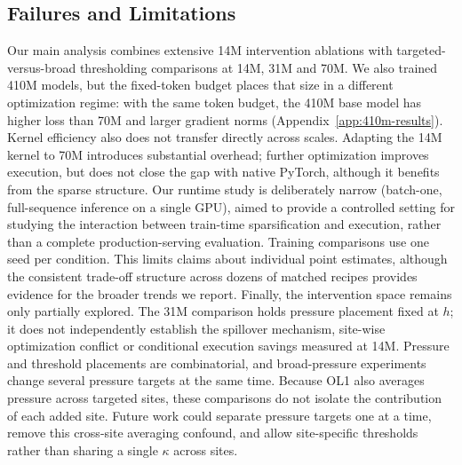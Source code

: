 \subsection{Failures and Limitations}

Our main analysis combines extensive 14M intervention ablations with targeted-versus-broad thresholding comparisons at 14M, 31M and 70M. We also trained 410M models, but the fixed-token budget places that size in a different optimization regime: with the same token budget, the 410M base model has higher loss than 70M and larger gradient norms (Appendix~\ref{app:410m-results}). Kernel efficiency also does not transfer directly across scales. Adapting the 14M kernel to 70M introduces substantial overhead; further optimization improves execution, but does not close the gap with native PyTorch, although it benefits from the sparse structure. Our runtime study is deliberately narrow (batch-one, full-sequence inference on a single GPU), aimed to provide a controlled setting for studying the interaction between train-time sparsification and execution, rather than a complete production-serving evaluation. Training comparisons use one seed per condition. This limits claims about individual point estimates, although the consistent trade-off structure across dozens of matched recipes provides evidence for the broader trends we report. Finally, the intervention space remains only partially explored. The 31M comparison holds pressure placement fixed at $h$; it does not independently establish the spillover mechanism, site-wise optimization conflict or conditional execution savings measured at 14M. Pressure and threshold placements are combinatorial, and broad-pressure experiments change several pressure targets at the same time. Because OL1 also averages pressure across targeted sites, these comparisons do not isolate the contribution of each added site. Future work could separate pressure targets one at a time, remove this cross-site averaging confound, and allow site-specific thresholds rather than sharing a single $\kappa$ across sites.

